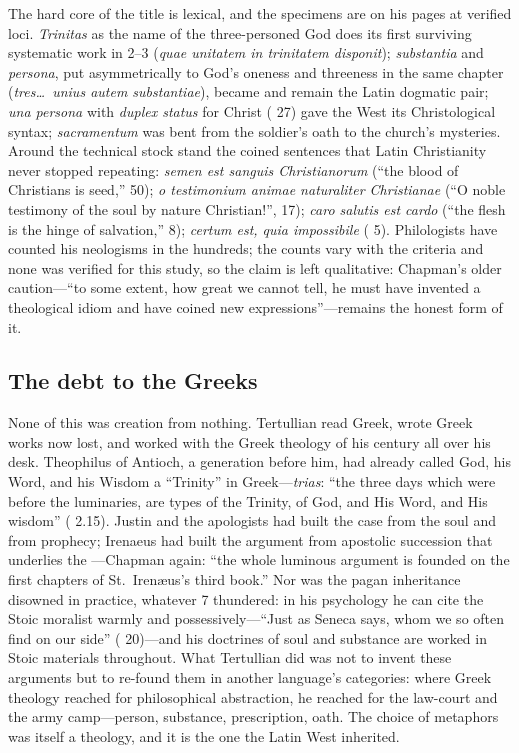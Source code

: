 The hard core of the title is lexical, and the specimens are on his pages at
verified loci. \textit{Trinitas} as the name of the three-personed God does
its first surviving systematic work in  2--3
(\textit{quae unitatem in trinitatem disponit}); \textit{substantia} and
\textit{persona}, put asymmetrically to God's oneness and threeness in the
same chapter (\textit{tres\ldots\ unius autem substantiae}), became and
remain the Latin dogmatic pair; \textit{una persona} with \textit{duplex
status} for Christ ( 27) gave the West its
Christological syntax; \textit{sacramentum} was bent from the soldier's oath
to the church's mysteries. Around the technical stock stand the coined
sentences that Latin Christianity never stopped repeating: \textit{semen est
sanguis Christianorum} (``the blood of Christians is seed,'' 
50); \textit{o testimonium animae naturaliter Christianae} (``O noble
testimony of the soul by nature Christian!'',  17); \textit{caro
salutis est cardo} (``the flesh is the hinge of salvation,''  8); \textit{certum est, quia impossibile}
( 5). Philologists have counted his neologisms
in the hundreds; the counts vary with the criteria and none was verified for
this study, so the claim is left qualitative: Chapman's older caution---``to
some extent, how great we cannot tell, he must have invented a theological
idiom and have coined new expressions''---remains the honest form of it.

\subsection{The debt to the Greeks}

None of this was creation from nothing. Tertullian read Greek, wrote Greek
works now lost, and worked with the Greek theology of his century all over
his desk. Theophilus of Antioch, a generation before him, had already called God, his
Word, and his Wisdom a ``Trinity'' in Greek---\textit{trias}: ``the three
days which were before the luminaries, are types of the Trinity, of God, and
His Word, and His wisdom'' ( 2.15). Justin and the apologists had built the case from the soul and from
prophecy; Irenaeus had built the argument from apostolic succession that
underlies the ---Chapman again: ``the whole luminous
argument is founded on the first chapters of St.~Iren\ae us's third book.''
Nor was the pagan inheritance disowned in practice, whatever
 7 thundered: in his psychology he can cite the Stoic
moralist warmly and possessively---``Just as Seneca says, whom we so often
find on our side'' ( 20)---and his doctrines of
soul and substance are worked in Stoic materials throughout. What Tertullian
did was not to invent these arguments but to re-found them in
another language's categories: where Greek theology reached for philosophical
abstraction, he reached for the law-court and the army camp---person,
substance, prescription, oath. The choice of metaphors was itself a theology,
and it is the one the Latin West inherited.

